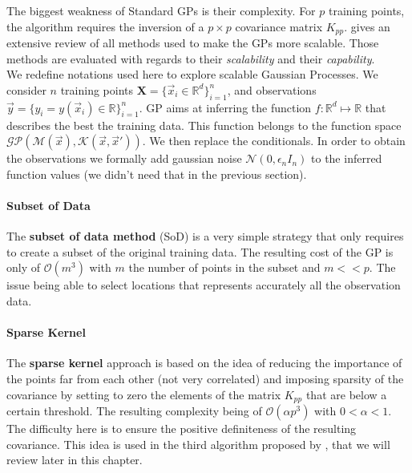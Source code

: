 The biggest weakness of Standard GPs is their complexity. For $p$ training points, the algorithm requires the inversion of a $p \times p$ covariance matrix $K_{pp}$. \citet{liu_when_2018} gives an extensive review of all methods used to make the GPs more scalable. Those methods are evaluated with regards to their \textit{scalability} and their \textit{capability}. \\ 

We redefine notations used here to explore scalable Gaussian Processes.  We consider $n$ training points $\mathbf{X}= \{\vec{x}_i \in \mathbb{R}^d \}^n_{i=1}$, and observations $\vec{y} = \{y_i = y(\vec{x}_i) \in \mathbb{R} \}^n_{i=1} $. GP aims at inferring the function $f: \mathbb{R}^d \mapsto \mathbb{R}$ that describes the best the training data. This function belongs to the  function space $\mathcal{GP}(\mathcal{M}(\vec{x}), \mathcal{K}(\vec{x},\vec{x}'))$. We then replace the conditionals.  In order to obtain the observations we formally add gaussian noise $\mathcal{N}(0,\epsilon_nI_n)$ to the inferred function values (we didn't need that in the previous section). 


 
 \paragraph{Subset of Data}



The \textbf{subset of data method} (SoD) is a very simple strategy that only requires to create a subset of the original training data. The resulting cost of the GP is only of $\mathcal{O}(m^3)$ with $m$ the number of points in the subset and $m << p$.  The issue being able to select locations that represents accurately all the observation data. \\

 \paragraph{Sparse Kernel}
 
The \textbf{sparse kernel} approach is based on the idea of reducing the importance of the points far from each other (not very correlated) and imposing sparsity of the covariance by setting to zero the elements of the matrix $K_{pp}$ that are below a certain threshold. The resulting complexity being of $\mathcal{O}(\alpha p^3)$ with $0 < \alpha < 1$. The difficulty here is to ensure the positive definiteness of the resulting covariance. This idea is used in the third algorithm proposed by \cite{krause_near-optimal_2008}, that we will review later in this chapter.  \\

